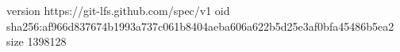 version https://git-lfs.github.com/spec/v1
oid sha256:af966d837674b1993a737c061b8404aeba606a622b5d25e3af0bfa45486b5ea2
size 1398128
